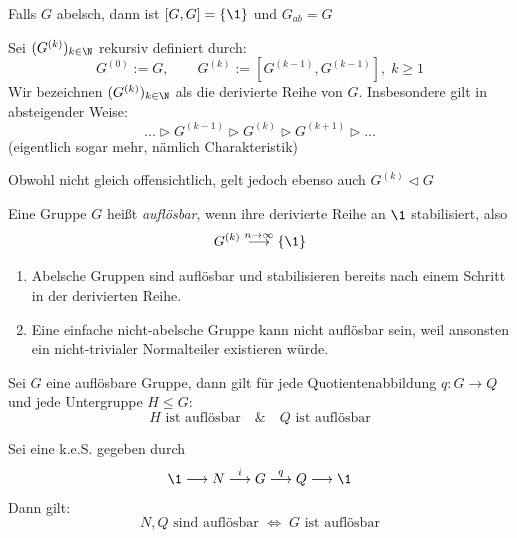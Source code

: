\documentclass[11pt, a4paper]{article}
\begin{document}
\begin{note}
    Falls $G$ abelsch, dann ist $[G,G] =\{\1\}$ und $G_{ab} = G$
\end{note}

\begin{definition}
Sei $(G^{(k)})_{k\in \N}$ rekursiv definiert durch:
$$G^{(0)} := G,\qquad G^{(k)}:= [G^{(k-1)},G^{(k-1)}], \; k\geq 1$$
Wir bezeichnen $(G^{(k)})_{k\in \N}$ als die derivierte Reihe von $G$. Insbesondere gilt in absteigender Weise:
$$...\triangleright G^{(k-1)} \triangleright G^{(k)} \triangleright G^{(k+1)} \triangleright ... $$
(eigentlich sogar mehr, nämlich Charakteristik)
\end{definition}

\begin{note}
    Obwohl nicht gleich offensichtlich, gelt jedoch ebenso auch $G^{(k)} \triangleleft G$
\end{note}

\begin{definition}
    Eine Gruppe $G$ heißt \emph{auflösbar}, wenn ihre derivierte Reihe an $\1$ stabilisiert, also
    $$G^{(k)}\overset{n\to \infty}{\longrightarrow} \{\1\}$$
\end{definition}

\begin{note}\mbox{}
    \begin{enumerate}[label= -]
        \item Abelsche Gruppen sind auflösbar und stabilisieren bereits nach einem Schritt in der derivierten Reihe.
        \item Eine einfache nicht-abelsche Gruppe kann nicht auflösbar sein, weil ansonsten ein nicht-trivialer Normalteiler existieren würde.
    \end{enumerate}
\end{note}

\begin{lemma} Sei $G$ eine auflösbare Gruppe, dann gilt für jede Quotientenabbildung $q:G\to Q$ und jede Untergruppe $H\leqslant G$:
$$H \text{ ist auflösbar} \quad \& \quad Q \text{ ist auflösbar} $$
\end{lemma}

\begin{theorem} Sei eine k.e.S. gegeben durch
$$\1 \longrightarrow N \overset{i}{\longrightarrow} G \overset{q}{\longrightarrow} Q\longrightarrow \1 $$
Dann gilt:
$$N, Q \text{ sind auflösbar } \Longleftrightarrow \;  G \text{ ist auflösbar}$$
    
\end{theorem}
\end{document}
